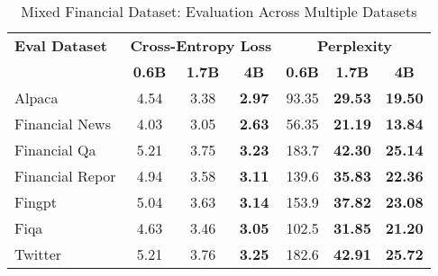 
\begin{table}[h]
\centering
\caption[Mixed Financial: Evaluation Results]{Mixed Financial Dataset: Evaluation Across Multiple Datasets}
\label{tab:mixed_financial_results}
\begin{tabular}{l|ccc|ccc}
\hline
\textbf{Eval Dataset} & \multicolumn{3}{c|}{\textbf{Cross-Entropy Loss}} & \multicolumn{3}{c}{\textbf{Perplexity}} \\
\cline{2-4} \cline{5-7}
  & \textbf{0.6B} & \textbf{1.7B} & \textbf{4B} & \textbf{0.6B} & \textbf{1.7B} & \textbf{4B} \\
\hline
Alpaca & 4.54 & 3.38 & \textbf{2.97} & 93.35 & \textbf{29.53} & \textbf{19.50} \\
Financial News & 4.03 & 3.05 & \textbf{2.63} & 56.35 & \textbf{21.19} & \textbf{13.84} \\
Financial Qa & 5.21 & 3.75 & \textbf{3.23} & 183.7 & \textbf{42.30} & \textbf{25.14} \\
Financial Repor & 4.94 & 3.58 & \textbf{3.11} & 139.6 & \textbf{35.83} & \textbf{22.36} \\
Fingpt & 5.04 & 3.63 & \textbf{3.14} & 153.9 & \textbf{37.82} & \textbf{23.08} \\
Fiqa & 4.63 & 3.46 & \textbf{3.05} & 102.5 & \textbf{31.85} & \textbf{21.20} \\
Twitter & 5.21 & 3.76 & \textbf{3.25} & 182.6 & \textbf{42.91} & \textbf{25.72} \\
\hline
\end{tabular}
\end{table}

